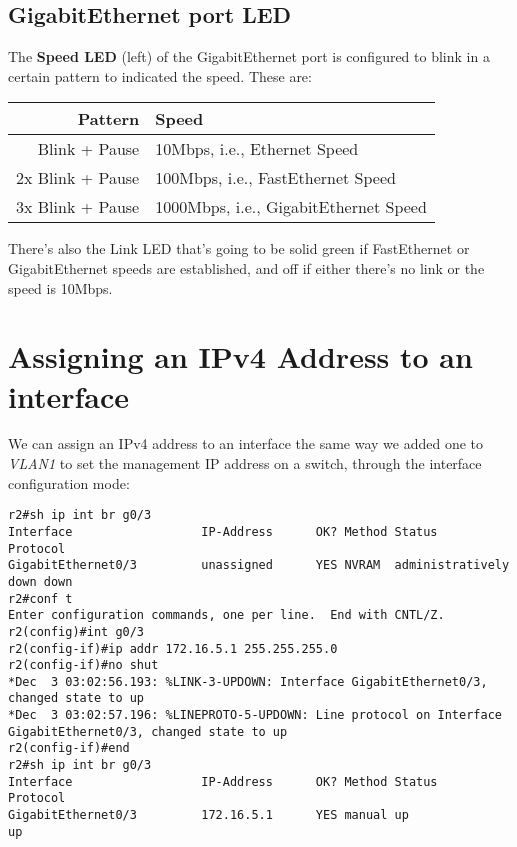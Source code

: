 \subsection{GigabitEthernet port LED}
The \textbf{Speed LED } (left) of the GigabitEthernet port is configured to blink in a certain pattern to indicated the speed. These are: 

\vspace{-10pt}
\noindent
\begin{center}
	\begin{tabular}{rl}
		\toprule
		\textbf{Pattern} &\textbf{Speed} \\
		\midrule
		Blink + Pause &10Mbps, i.e., Ethernet Speed\\
		2x Blink + Pause &100Mbps, i.e., FastEthernet Speed\\
		3x Blink + Pause &1000Mbps, i.e., GigabitEthernet Speed\\
		\bottomrule
	\end{tabular}
\end{center}
\noindent
There's also the Link LED that's going to be solid green if FastEthernet or GigabitEthernet speeds are established, and off if either there's no link or the speed is 10Mbps. 

\section{Assigning an IPv4 Address to an interface}
We can assign an IPv4 address to an interface the same way we added one to \textit{VLAN1} to set the management IP address on a switch, through the interface configuration mode:

\vspace{-15pt}
\begin{verbatim}
r2#sh ip int br g0/3
Interface                  IP-Address      OK? Method Status                Protocol
GigabitEthernet0/3         unassigned      YES NVRAM  administratively down down
r2#conf t
Enter configuration commands, one per line.  End with CNTL/Z.
r2(config)#int g0/3
r2(config-if)#ip addr 172.16.5.1 255.255.255.0
r2(config-if)#no shut
*Dec  3 03:02:56.193: %LINK-3-UPDOWN: Interface GigabitEthernet0/3, changed state to up
*Dec  3 03:02:57.196: %LINEPROTO-5-UPDOWN: Line protocol on Interface GigabitEthernet0/3, changed state to up
r2(config-if)#end
r2#sh ip int br g0/3
Interface                  IP-Address      OK? Method Status                Protocol
GigabitEthernet0/3         172.16.5.1      YES manual up                    up
\end{verbatim}
\vspace{-10pt}

